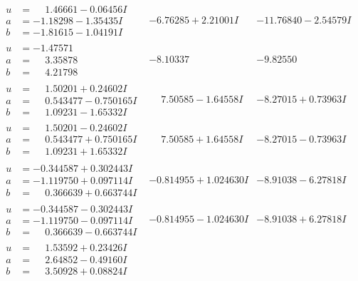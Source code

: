 \documentclass[1p]{elsarticle_modified}
\theoremstyle{definition}
\begin{document}
$$\begin{array}{c|c|c}
\begin{aligned}
u &= \phantom{-}1.46661 - 0.06456 I \\
a &= -1.18298 - 1.35435 I \\
b &= -1.81615 - 1.04191 I\end{aligned}
 & -6.76285 + 2.21001 I & -11.76840 - 2.54579 I \\ \hline\begin{aligned}
u &= -1.47571\phantom{ +0.000000I} \\
a &= \phantom{-}3.35878\phantom{ +0.000000I} \\
b &= \phantom{-}4.21798\phantom{ +0.000000I}\end{aligned}
 & -8.10337\phantom{ +0.000000I} & -9.82550\phantom{ +0.000000I} \\ \hline\begin{aligned}
u &= \phantom{-}1.50201 + 0.24602 I \\
a &= \phantom{-}0.543477 - 0.750165 I \\
b &= \phantom{-}1.09231 - 1.65332 I\end{aligned}
 & \phantom{-}7.50585 - 1.64558 I & -8.27015 + 0.73963 I \\ \hline\begin{aligned}
u &= \phantom{-}1.50201 - 0.24602 I \\
a &= \phantom{-}0.543477 + 0.750165 I \\
b &= \phantom{-}1.09231 + 1.65332 I\end{aligned}
 & \phantom{-}7.50585 + 1.64558 I & -8.27015 - 0.73963 I \\ \hline\begin{aligned}
u &= -0.344587 + 0.302443 I \\
a &= -1.119750 + 0.097114 I \\
b &= \phantom{-}0.366639 + 0.663744 I\end{aligned}
 & -0.814955 + 1.024630 I & -8.91038 - 6.27818 I \\ \hline\begin{aligned}
u &= -0.344587 - 0.302443 I \\
a &= -1.119750 - 0.097114 I \\
b &= \phantom{-}0.366639 - 0.663744 I\end{aligned}
 & -0.814955 - 1.024630 I & -8.91038 + 6.27818 I \\ \hline\begin{aligned}
u &= \phantom{-}1.53592 + 0.23426 I \\
a &= \phantom{-}2.64852 - 0.49160 I \\
b &= \phantom{-}3.50928 + 0.08824 I\end{aligned}

\end{array}$$
\end{document}
